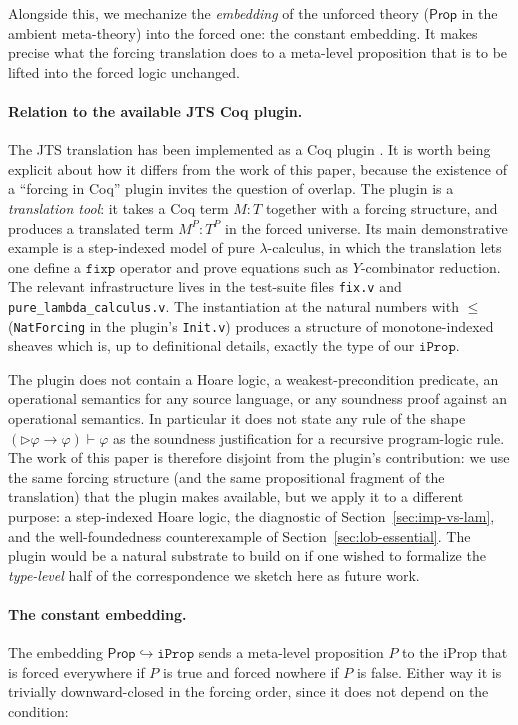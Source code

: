 Alongside this, we mechanize the \emph{embedding} of the unforced
theory ($\mathsf{Prop}$ in the ambient meta-theory) into the forced
one: the constant embedding.  It makes precise what the forcing
translation does to a meta-level proposition that is to be lifted
into the forced logic unchanged.

\paragraph{Relation to the available JTS Coq plugin.}
The JTS translation has been implemented as a Coq plugin
\cite{forcing-coq-plugin}.  It is worth being explicit about how it
differs from the work of this paper, because the existence of a
``forcing in Coq'' plugin invites the question of overlap.  The
plugin is a \emph{translation tool}: it takes a Coq term $M : T$
together with a forcing structure, and produces a translated term
$M^P : T^P$ in the forced universe.  Its main demonstrative example
is a step-indexed model of pure $\lambda$-calculus, in which the
translation lets one define a $\mathtt{fixp}$ operator and prove
equations such as $Y$-combinator reduction. The relevant
infrastructure lives in the test-suite files \texttt{fix.v} and
\texttt{pure\_lambda\_calculus.v}.  The instantiation at the natural
numbers with $\le$ (\texttt{NatForcing} in the plugin's \texttt{Init.v})
produces a structure of monotone-indexed sheaves which is, up to
definitional details, exactly the type of our $\mathtt{iProp}$.

The plugin does not contain a Hoare logic, a weakest-precondition
predicate, an operational semantics for any source language, or any
soundness proof against an operational semantics.  In particular it
does not state any rule of the shape $(\triangleright \varphi \to
\varphi) \vdash \varphi$ as the soundness justification for a
recursive program-logic rule.  The work of this paper is therefore
disjoint from the plugin's contribution: we use the same forcing
structure (and the same propositional fragment of the translation)
that the plugin makes available, but we apply it to a different
purpose: a step-indexed Hoare logic, the diagnostic of
Section~\ref{sec:imp-vs-lam}, and the well-foundedness counterexample
of Section~\ref{sec:lob-essential}.  The plugin would be a natural
substrate to build on if one wished to formalize the
\emph{type-level} half of the correspondence we sketch here as
future work.

\paragraph{The constant embedding.}
The embedding $\mathsf{Prop} \hookrightarrow \mathtt{iProp}$ sends a
meta-level proposition $P$ to the iProp that is forced everywhere if
$P$ is true and forced nowhere if $P$ is false.  Either way it is
trivially downward-closed in the forcing order, since it does not
depend on the condition:

